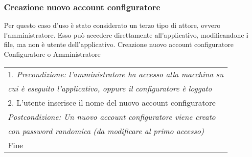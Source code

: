\begin{minipage}{\textwidth}
    \subsubsection{Creazione nuovo account configuratore}
    Per questo caso d'uso è stato considerato un terzo tipo di attore, ovvero
    l'amministratore. Esso può accedere direttamente all'applicativo, modificandone
    i file, ma non è utente dell'applicativo.
    \usecase
        {Creazione nuovo account configuratore}
        {Configuratore o Amministratore}
        {
            \begin{tabular}{l}
                1. \textit{Precondizione: l'amministratore ha accesso alla macchina su}\\
                \textit{cui è eseguito l'applicativo, oppure il configuratore è loggato}\\
                2. L'utente inserisce il nome del nuovo account configuratore\\
                \textit{Postcondizione: Un nuovo account configuratore viene creato} \\
                \textit{con password randomica (da modificare al primo accesso)}\\
                Fine
            \end{tabular} \\
        }
        \vspace{0.5cm}
\end{minipage}